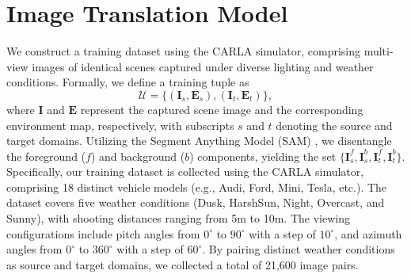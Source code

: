 \clearpage

\appendices

\section{Image Translation Model}
We construct a training dataset using the CARLA simulator, comprising multi-view images of identical scenes captured under diverse lighting and weather conditions. 
Formally, we define a training tuple as 
\begin{equation}
    \mathcal{U} = \{ (\bm{I}_s, \bm{E}_s), (\bm{I}_t, \bm{E}_t) \}, 
\end{equation}
where $\bm{I}$ and $\bm{E}$ represent the captured scene image and the corresponding environment map, respectively, with subscripts $s$ and $t$ denoting the source and target domains.
Utilizing the Segment Anything Model (SAM) \cite{kirillov2023sam}, we disentangle the foreground ($f$) and background ($b$) components, yielding the set $\{\bm{I}_s^f, \bm{I}_s^b, \bm{I}_t^f, \bm{I}_t^b\}$.
Specifically, our training dataset is collected using the CARLA simulator, comprising 18 distinct vehicle models (e.g., Audi, Ford, Mini, Tesla, etc.). The dataset covers five weather conditions (Dusk, HarshSun, Night, Overcast, and Sunny), with shooting distances ranging from 5m to 10m. The viewing configurations include pitch angles from $0^{\circ}$ to $90^{\circ}$ with a step of $10^{\circ}$, and azimuth angles from $0^{\circ}$ to $360^{\circ}$ with a step of $60^{\circ}$. By pairing distinct weather conditions as source and target domains, we collected a total of 21,600 image pairs.

